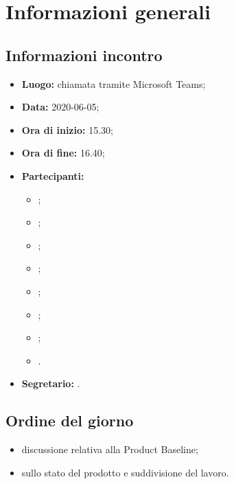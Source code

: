 \section{Informazioni generali}
\subsection{Informazioni incontro}
\begin{itemize}
	\item \textbf{Luogo:} chiamata tramite Microsoft Teams;
	\item \textbf{Data:} 2020-06-05;
	\item \textbf{Ora di inizio:} 15.30;
	\item \textbf{Ora di fine:} 16.40;
	\item \textbf{Partecipanti:}
		\begin{itemize}
			\item \VB;
			\item \LB;
			\item \NF;
			\item \EG;
			\item \FJ;
			\item \MP;
			\item \AS;
			\item \AZ.
		\end{itemize}
	\item \textbf{Segretario:} \VB.
\end{itemize}

\subsection{Ordine del giorno}
\begin{itemize}
	\item discussione relativa alla Product Baseline;
	\item sullo stato del prodotto e suddivisione del lavoro.
\end{itemize}
